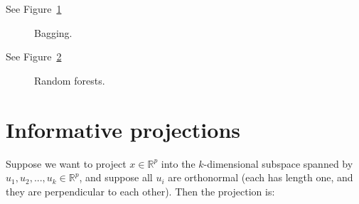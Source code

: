  See Figure~\ref{fig:bagging_mar}
\begin{figure}[H]
    \caption{Bagging.}
    \label{fig:bagging_mar}
\end{figure}


 See Figure~\ref{fig:random_forest_mar}
\begin{figure}[H]
    \caption{Random forests.}
    \label{fig:random_forest_mar}
\end{figure}

\section{Informative projections} 

 Suppose we want to project $x \in \mathbb{R}^p$
into the $k$-dimensional subspace spanned by $u_1, u_2, ..., u_k \in \mathbb{R}^p$, 
and suppose all $u_i$ are orthonormal (each has length one, and they are perpendicular to 
each other). Then the projection is:

